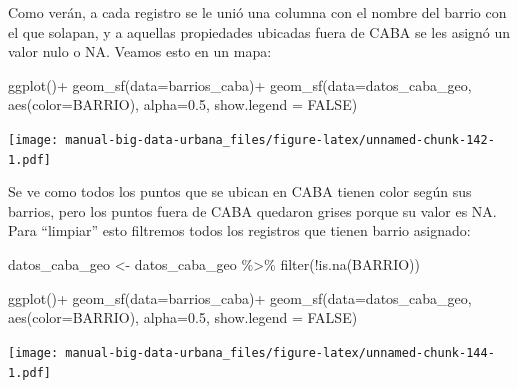 \documentclass[
  spanish,
]{book}
\newenvironment{Shaded}{\begin{snugshade}}{\end{snugshade}}
\newcommand{\AttributeTok}[1]{\textcolor[rgb]{0.77,0.63,0.00}{#1}}
\newcommand{\ConstantTok}[1]{\textcolor[rgb]{0.00,0.00,0.00}{#1}}
\newcommand{\FloatTok}[1]{\textcolor[rgb]{0.00,0.00,0.81}{#1}}
\newcommand{\FunctionTok}[1]{\textcolor[rgb]{0.00,0.00,0.00}{#1}}
\newcommand{\NormalTok}[1]{#1}
\newcommand{\OtherTok}[1]{\textcolor[rgb]{0.56,0.35,0.01}{#1}}
\newcommand{\SpecialCharTok}[1]{\textcolor[rgb]{0.00,0.00,0.00}{#1}}
\begin{document}
Como verán, a cada registro se le unió una columna con el nombre del barrio con el que solapan, y a aquellas propiedades ubicadas fuera de CABA se les asignó un valor nulo o NA. Veamos esto en un mapa:

\begin{Shaded}
\begin{Highlighting}[]
\FunctionTok{ggplot}\NormalTok{()}\SpecialCharTok{+}
  \FunctionTok{geom\_sf}\NormalTok{(}\AttributeTok{data=}\NormalTok{barrios\_caba)}\SpecialCharTok{+}
  \FunctionTok{geom\_sf}\NormalTok{(}\AttributeTok{data=}\NormalTok{datos\_caba\_geo, }\FunctionTok{aes}\NormalTok{(}\AttributeTok{color=}\NormalTok{BARRIO), }\AttributeTok{alpha=}\FloatTok{0.5}\NormalTok{, }\AttributeTok{show.legend =} \ConstantTok{FALSE}\NormalTok{)}
\end{Highlighting}
\end{Shaded}

\texttt{[image: manual-big-data-urbana\_files/figure-latex/unnamed-chunk-142-1.pdf]}

Se ve como todos los puntos que se ubican en CABA tienen color según sus barrios, pero los puntos fuera de CABA quedaron grises porque su valor es NA. Para ``limpiar'' esto filtremos todos los registros que tienen barrio asignado:

\begin{Shaded}
\begin{Highlighting}[]
\NormalTok{datos\_caba\_geo }\OtherTok{\textless{}{-}}\NormalTok{ datos\_caba\_geo }\SpecialCharTok{\%\textgreater{}\%}
  \FunctionTok{filter}\NormalTok{(}\SpecialCharTok{!}\FunctionTok{is.na}\NormalTok{(BARRIO))}
\end{Highlighting}
\end{Shaded}

\begin{Shaded}
\begin{Highlighting}[]
\FunctionTok{ggplot}\NormalTok{()}\SpecialCharTok{+}
  \FunctionTok{geom\_sf}\NormalTok{(}\AttributeTok{data=}\NormalTok{barrios\_caba)}\SpecialCharTok{+}
  \FunctionTok{geom\_sf}\NormalTok{(}\AttributeTok{data=}\NormalTok{datos\_caba\_geo, }\FunctionTok{aes}\NormalTok{(}\AttributeTok{color=}\NormalTok{BARRIO), }\AttributeTok{alpha=}\FloatTok{0.5}\NormalTok{, }\AttributeTok{show.legend =} \ConstantTok{FALSE}\NormalTok{)}
\end{Highlighting}
\end{Shaded}

\texttt{[image: manual-big-data-urbana\_files/figure-latex/unnamed-chunk-144-1.pdf]}
\end{document}
